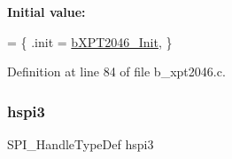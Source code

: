 {\bfseries Initial value\+:}
\begin{DoxyCode}
= 
\{
        .init = \mbox{\hyperlink{group___x_p_t2046___exported___functions_ga154a04ec3490a9d74bd6dda386389871}{bXPT2046\_Init}},
\}
\end{DoxyCode}


Definition at line 84 of file b\+\_\+xpt2046.\+c.

\mbox{\label{group___x_p_t2046___private___variables_gaec51920045aad7f70cbfd1f58228d866}} 
\subsubsection{\texorpdfstring{hspi3}{hspi3}}
{\footnotesize\ttfamily S\+P\+I\+\_\+\+Handle\+Type\+Def hspi3}

